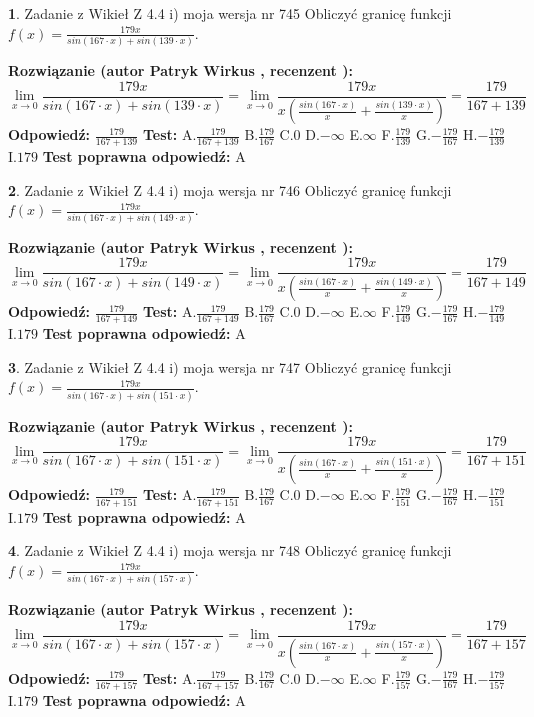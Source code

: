 \documentclass[12pt, a4paper]{article}
\theoremstyle{definition} %
\newtheorem{zad}{}
\newcommand{\zadStart}[1]{\begin{zad}#1\newline}
\newcommand{\zadStop}{\end{zad}}
\newcommand{\rozwStart}[2]{\noindent \textbf{Rozwiązanie (autor #1 , recenzent #2): }\newline}
\newcommand{\rozwStop}{\newline}
\newcommand{\odpStart}{\noindent \textbf{Odpowiedź:}\newline}
\newcommand{\odpStop}{\newline}
\newcommand{\testStart}{\noindent \textbf{Test:}\newline}
\newcommand{\testStop}{\newline}
\newcommand{\kluczStart}{\noindent \textbf{Test poprawna odpowiedź:}\newline}
\newcommand{\kluczStop}{\newline}
\begin{document}
\zadStart{Zadanie z Wikieł Z 4.4 i) moja wersja nr 745}
Obliczyć granicę funkcji $f(x)=\frac{179x}{sin(167\cdot x) +sin(139\cdot x)}$.
\zadStop
\rozwStart{Patryk Wirkus}{}
$$\lim\limits_{x\to 0}\frac{179x}{sin(167\cdot x) +sin(139\cdot x)}=\lim\limits_{x\to 0}\frac{179x}{x(\frac{sin(167\cdot x)}{x}+\frac{sin(139\cdot x)}{x})}=\frac{179}{167+139}$$
\rozwStop
\odpStart
$\frac{179}{167+139}$
\odpStop
\testStart
A.$\frac{179}{167+139}$
B.$\frac{179}{167}$
C.$0$
D.$-\infty$
E.$\infty$
F.$\frac{179}{139}$
G.$-\frac{179}{167}$
H.$-\frac{179}{139}$
I.$179$
\testStop
\kluczStart
A
\kluczStop



\zadStart{Zadanie z Wikieł Z 4.4 i) moja wersja nr 746}
Obliczyć granicę funkcji $f(x)=\frac{179x}{sin(167\cdot x) +sin(149\cdot x)}$.
\zadStop
\rozwStart{Patryk Wirkus}{}
$$\lim\limits_{x\to 0}\frac{179x}{sin(167\cdot x) +sin(149\cdot x)}=\lim\limits_{x\to 0}\frac{179x}{x(\frac{sin(167\cdot x)}{x}+\frac{sin(149\cdot x)}{x})}=\frac{179}{167+149}$$
\rozwStop
\odpStart
$\frac{179}{167+149}$
\odpStop
\testStart
A.$\frac{179}{167+149}$
B.$\frac{179}{167}$
C.$0$
D.$-\infty$
E.$\infty$
F.$\frac{179}{149}$
G.$-\frac{179}{167}$
H.$-\frac{179}{149}$
I.$179$
\testStop
\kluczStart
A
\kluczStop



\zadStart{Zadanie z Wikieł Z 4.4 i) moja wersja nr 747}
Obliczyć granicę funkcji $f(x)=\frac{179x}{sin(167\cdot x) +sin(151\cdot x)}$.
\zadStop
\rozwStart{Patryk Wirkus}{}
$$\lim\limits_{x\to 0}\frac{179x}{sin(167\cdot x) +sin(151\cdot x)}=\lim\limits_{x\to 0}\frac{179x}{x(\frac{sin(167\cdot x)}{x}+\frac{sin(151\cdot x)}{x})}=\frac{179}{167+151}$$
\rozwStop
\odpStart
$\frac{179}{167+151}$
\odpStop
\testStart
A.$\frac{179}{167+151}$
B.$\frac{179}{167}$
C.$0$
D.$-\infty$
E.$\infty$
F.$\frac{179}{151}$
G.$-\frac{179}{167}$
H.$-\frac{179}{151}$
I.$179$
\testStop
\kluczStart
A
\kluczStop



\zadStart{Zadanie z Wikieł Z 4.4 i) moja wersja nr 748}
Obliczyć granicę funkcji $f(x)=\frac{179x}{sin(167\cdot x) +sin(157\cdot x)}$.
\zadStop
\rozwStart{Patryk Wirkus}{}
$$\lim\limits_{x\to 0}\frac{179x}{sin(167\cdot x) +sin(157\cdot x)}=\lim\limits_{x\to 0}\frac{179x}{x(\frac{sin(167\cdot x)}{x}+\frac{sin(157\cdot x)}{x})}=\frac{179}{167+157}$$
\rozwStop
\odpStart
$\frac{179}{167+157}$
\odpStop
\testStart
A.$\frac{179}{167+157}$
B.$\frac{179}{167}$
C.$0$
D.$-\infty$
E.$\infty$
F.$\frac{179}{157}$
G.$-\frac{179}{167}$
H.$-\frac{179}{157}$
I.$179$
\testStop
\kluczStart
A
\kluczStop
\end{document}
